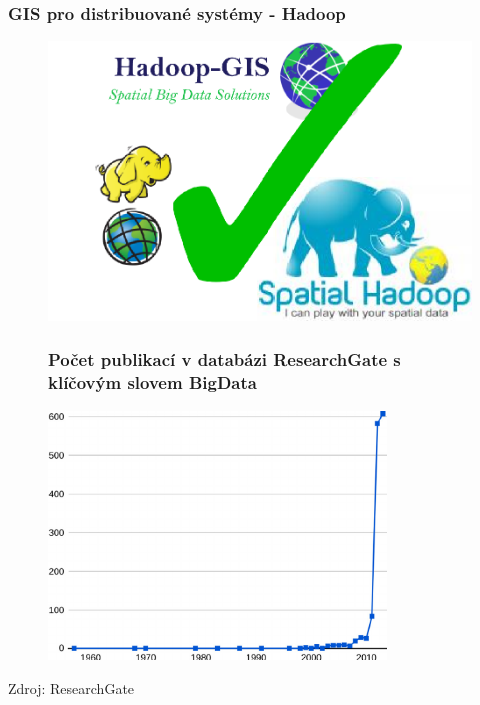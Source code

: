 \documentclass[unicode,bookmarksnumbered]{beamer}
\begin{document}
	\begin{frame}
		\frametitle{GIS pro distribuované systémy - Hadoop}
		\begin{figure}
			\centering
			\includegraphics[width=1\textwidth]{./img/motivace/yes.png}
			\label{fig:eu_all}
		\end{figure}
	\end{frame}
%
	\begin{frame}
		\begin{figure}
			\frametitle{Počet publikací v databázi ResearchGate s klíčovým slovem BigData}
			\centering
			\includegraphics[width=0.8\textwidth]{./img/motivace/num_of_publication.png}
			\label{fig:num_of_publication}
		\end{figure}
		Zdroj: ResearchGate
	\end{frame}
%
\end{document}
